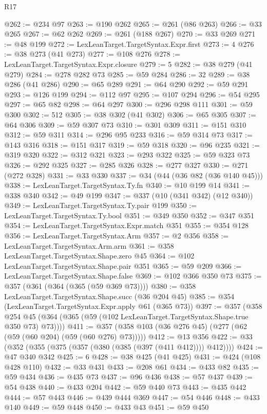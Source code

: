 \begin{lexlean}{R17}
\begin{coremodule}
@262 := @234 @97
@263 := @190 @262
@265 := @261 (@86 @263)
@266 := @33 @265
@267 := @62 @262
@269 := @261 (@188 @267)
@270 := @33 @269
@271 := @48 @199
@272 := LexLeanTarget.TargetSyntax.Expr.first
@273 := 4
@276 := @38 @273 (@41 @273)
@277 := @108 @276
@278 := LexLeanTarget.TargetSyntax.Expr.closure
@279 := 5
@282 := @38 @279 (@41 @279)
@284 := @278 @282 @73
@285 := @59 @284
@286 := 32
@289 := @38 @286 (@41 @286)
@290 := @65 @289
@291 := @64 @290
@292 := @59 @291
@293 := @126 @199
@294 := @112 @97
@295 := @107 @294
@296 := @54 @295
@297 := @65 @82
@298 := @64 @297
@300 := @296 @298 @111
@301 := @59 @300
@302 := 512
@305 := @38 @302 (@41 @302)
@306 := @65 @305
@307 := @64 @306
@309 := @59 @307 @73
@310 := @301 @309
@311 := @151 @310
@312 := @59 @311
@314 := @296 @95 @233
@316 := @59 @314 @73
@317 := @143 @316
@318 := @151 @317
@319 := @59 @318
@320 := @96 @235
@321 := @319 @320
@322 := @312 @321
@323 := @293 @322
@325 := @59 @323 @73
@326 := @292 @325
@327 := @285 @326
@328 := @277 @327
@330 := @271 (@272 @328)
@331 := @33 @330
@337 := @34 (@44 (@36 @82 (@36 @140 @45)))
@338 := LexLeanTarget.TargetSyntax.Ty.fn
@340 := @10 @199 @14
@341 := @338 @340
@342 := @49 @199
@347 := @337 (@10 (@341 @342) (@12 @340))
@349 := LexLeanTarget.TargetSyntax.Ty.pair @199
@350 := LexLeanTarget.TargetSyntax.Ty.bool
@351 := @349 @350
@352 := @347 @351
@354 := LexLeanTarget.TargetSyntax.Expr.match @351
@355 := @354 @128
@356 := LexLeanTarget.TargetSyntax.Arm
@357 := @2 @356
@358 := LexLeanTarget.TargetSyntax.Arm.arm
@361 := @358 LexLeanTarget.TargetSyntax.Shape.zero @45
@364 := @102 LexLeanTarget.TargetSyntax.Shape.pair @351
@365 := @59 @209
@366 := LexLeanTarget.TargetSyntax.Shape.false
@369 := @102 @366 @350 @73
@375 := @357 (@361 (@364 (@365 (@59 @369 @73))))
@380 := @358 LexLeanTarget.TargetSyntax.Shape.succ (@36 @204 @45)
@385 := @354 (LexLeanTarget.TargetSyntax.Expr.apply @61 (@365 @73))
@397 := @357
    (@358 @254 @45 (@364 (@365 (@59 (@102 LexLeanTarget.TargetSyntax.Shape.true @350 @73) @73))))
@411 := @357 (@358 @103 (@36 @276 @45) (@277 (@62 (@59 (@60 @204) (@59 (@60 @276) @73)))))
@412 := @13 @356
@422 := @33 (@352 (@355 (@375 (@357 (@380 (@385 (@397 (@411 @412)))) @412))))
@424 := @47 @340 @342
@425 := 6
@428 := @38 @425 (@41 @425)
@431 := @424 (@108 @428 @110)
@432 := @33 @431
@433 := @208 @61
@434 := @433 @82
@435 := @59 @434
@436 := @435 @73
@437 := @96 @436
@438 := @57 @437
@439 := @54 @438
@440 := @433 @204
@442 := @59 @440 @73
@443 := @435 @442
@444 := @57 @443
@446 := @439 @444 @369
@447 := @54 @446
@448 := @433 @140
@449 := @59 @448
@450 := @433 @43
@451 := @59 @450

\end{coremodule}
\end{lexlean}

